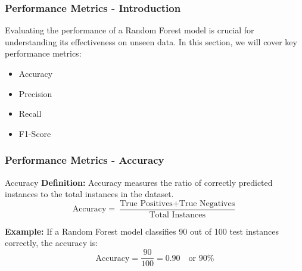 \documentclass[aspectratio=169]{beamer}
\begin{document}
\begin{frame}[fragile]
    \frametitle{Performance Metrics - Introduction}
    Evaluating the performance of a Random Forest model is crucial for understanding its effectiveness on unseen data. 
    In this section, we will cover key performance metrics:
    \begin{itemize}
        \item Accuracy
        \item Precision
        \item Recall
        \item F1-Score
    \end{itemize}
\end{frame}

\begin{frame}[fragile]
    \frametitle{Performance Metrics - Accuracy}
    \begin{block}{Accuracy}
        \textbf{Definition:} Accuracy measures the ratio of correctly predicted instances to the total instances in the dataset.
        \begin{equation}
            \text{Accuracy} = \frac{\text{True Positives} + \text{True Negatives}}{\text{Total Instances}}
        \end{equation}

        \textbf{Example:} If a Random Forest model classifies 90 out of 100 test instances correctly, the accuracy is:
        \begin{equation}
            \text{Accuracy} = \frac{90}{100} = 0.90 \quad \text{or } 90\%
        \end{equation}
    \end{block}
\end{frame}
\end{document}
